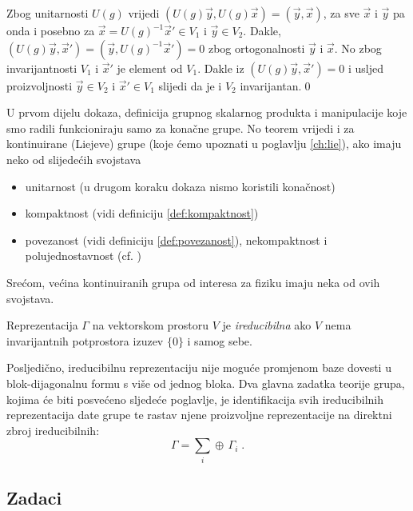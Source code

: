 Zbog unitarnosti $U(g)$ vrijedi $(U(g) \vec{y} , U(g)\vec{x}) = 
(\vec{y}, \vec{x})$,
za sve $\vec{x}$ i $\vec{y}$ pa onda i posebno za 
$\vec{x}=U(g)^{-1}\vec{x}'\in V_1$ i
$\vec{y} \in V_2$. Dakle, $(U(g)\vec{y}, \vec{x}')=(\vec{y}, U(g)^{-1}\vec{x}')
=0$ zbog ortogonalnosti $\vec{y}$ i $\vec{x}$.
No zbog invarijantnosti $V_1$ i $\vec{x}'$ je element od $V_1$. Dakle iz
$(U(g) \vec{y} , \vec{x}') = 0$ i usljed proizvoljnosti $\vec{y}\in V_2$
i $\vec{x}'\in V_1$ slijedi da je i $V_2$ invarijantan.\qed


U prvom dijelu dokaza, definicija grupnog skalarnog produkta i manipulacije
koje smo radili funkcioniraju samo za konačne grupe. No teorem vrijedi i 
za kontinuirane (Liejeve) grupe (koje ćemo upoznati u poglavlju \ref{ch:lie}),
ako imaju neko od slijedećih svojstava
\begin{itemize}
\item unitarnost (u drugom koraku dokaza nismo koristili konačnost)
\item kompaktnost (vidi definiciju \ref{def:kompaktnost})
\item povezanost (vidi definiciju \ref{def:povezanost}), nekompaktnost i polujednostavnost (cf. \cite[79]{Cornwell:1997})
\end{itemize}
Srećom, većina kontinuiranih grupa od interesa za fiziku imaju neka od ovih svojstava.


\begin{definicija}
Reprezentacija $\Gamma$ na vektorskom prostoru $V$ je
\emph{ireducibilna} ako $V$ nema invarijantnih potprostora
izuzev $\{0\}$ i samog sebe.
\label{def:irrep}
\end{definicija}
Posljedično, ireducibilnu reprezentaciju nije moguće promjenom baze 
dovesti u blok-dijagonalnu formu s više od jednog bloka.
Dva glavna zadatka teorije grupa, kojima će biti posvećeno sljedeće poglavlje,
je identifikacija svih ireducibilnih reprezentacija date grupe te rastav
njene proizvoljne reprezentacije na direktni zbroj ireducibilnih:
\begin{displaymath}
  \Gamma = \sum_{i} \oplus\, \Gamma_{i} \;.
\end{displaymath}



\subsection*{Zadaci}

